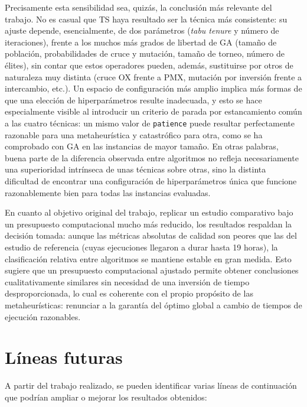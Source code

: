 Precisamente esta sensibilidad sea, quizás, la conclusión más relevante del trabajo. No es casual que TS haya resultado ser
la técnica más consistente: su ajuste depende, esencialmente, de dos parámetros (\textit{tabu tenure} y número de iteraciones),
frente a los muchos más grados de libertad de GA (tamaño de población, probabilidades de cruce y mutación, tamaño de
torneo, número de élites), sin contar que estos operadores pueden, además, sustituirse por otros de naturaleza muy distinta
(cruce OX frente a PMX, mutación por inversión frente a intercambio, etc.). Un espacio de configuración más amplio implica
más formas de que una elección de hiperparámetros resulte inadecuada, y esto se hace especialmente visible al introducir
un criterio de parada por estancamiento común a las cuatro técnicas: un mismo valor de \texttt{patience} puede resultar
perfectamente razonable para una metaheurística y catastrófico para otra, como se ha comprobado con GA en las instancias
de mayor tamaño. En otras palabras, buena parte de la diferencia observada entre algoritmos no refleja necesariamente una
superioridad intrínseca de unas técnicas sobre otras, sino la distinta dificultad de encontrar una configuración de
hiperparámetros única que funcione razonablemente bien para todas las instancias evaluadas.

En cuanto al objetivo original del trabajo, replicar un estudio comparativo bajo un presupuesto computacional mucho más
reducido, los resultados respaldan la decisión tomada: aunque las métricas absolutas de calidad son peores que las del
estudio de referencia (cuyas ejecuciones llegaron a durar hasta 19 horas), la clasificación relativa entre algoritmos se
mantiene estable en gran medida. Esto sugiere que un presupuesto computacional ajustado permite obtener conclusiones
cualitativamente similares sin necesidad de una inversión de tiempo desproporcionada, lo cual es coherente con el propio
propósito de las metaheurísticas: renunciar a la garantía del óptimo global a cambio de tiempos de ejecución razonables.

\section{Líneas futuras}
\label{sec:fut-lin}

A partir del trabajo realizado, se pueden identificar varias líneas de continuación que podrían ampliar o mejorar los 
resultados obtenidos:


